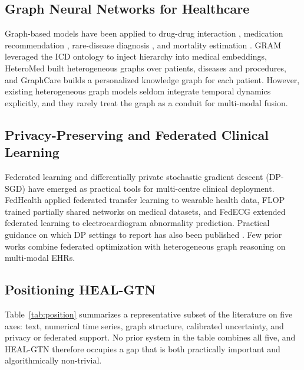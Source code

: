 \documentclass[conference]{IEEEtran}
\begin{document}
\subsection{Graph Neural Networks for Healthcare}
Graph-based models have been applied to drug-drug interaction \cite{zitnik2018}, medication recommendation \cite{shang2019gamenet,shang2019gbert}, rare-disease diagnosis \cite{alsentzer2025shepherd}, and mortality estimation \cite{choi2020gct}. GRAM \cite{choi2017gram} leveraged the ICD ontology to inject hierarchy into medical embeddings, HeteroMed \cite{hosseini2018heteromed} built heterogeneous graphs over patients, diseases and procedures, and GraphCare \cite{jiang2024graphcare} builds a personalized knowledge graph for each patient. However, existing heterogeneous graph models seldom integrate temporal dynamics explicitly, and they rarely treat the graph as a conduit for multi-modal fusion.

\subsection{Privacy-Preserving and Federated Clinical Learning}
Federated learning \cite{mcmahan2017} and differentially private stochastic gradient descent (DP-SGD) \cite{abadi2016} have emerged as practical tools for multi-centre clinical deployment. FedHealth \cite{chen2020fedhealth} applied federated transfer learning to wearable health data, FLOP \cite{yang2021flop} trained partially shared networks on medical datasets, and FedECG \cite{ying2023fedecg} extended federated learning to electrocardiogram abnormality prediction. Practical guidance on which DP settings to report has also been published \cite{ponomareva2023}. Few prior works combine federated optimization with heterogeneous graph reasoning on multi-modal EHRs.

\subsection{Positioning HEAL-GTN}
Table~\ref{tab:position} summarizes a representative subset of the literature on five axes: text, numerical time series, graph structure, calibrated uncertainty, and privacy or federated support. No prior system in the table combines all five, and HEAL-GTN therefore occupies a gap that is both practically important and algorithmically non-trivial.
\end{document}
